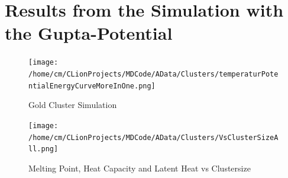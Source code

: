 \section{Results from the Simulation with the Gupta-Potential}

\begin{figure}[!h] 
	\begin{center} 
		\texttt{[image: /home/cm/CLionProjects/MDCode/AData/Clusters/temperaturPotentialEnergyCurveMoreInOne.png]} 
	\end{center} 
	\caption[Gold Cluster Simulation]{Gold Cluster Simulation} 
	\label{GoldClusterSimulationTemperaturEnergy4In1} 
\end{figure} 

\begin{figure}[!h] 
	\begin{center} 
		\texttt{[image: /home/cm/CLionProjects/MDCode/AData/Clusters/VsClusterSizeAll.png]} 
	\end{center} 
	\caption[Melting Point, Heat Capacity and Latent Heat vs Clustersize]{Melting Point, Heat Capacity and Latent Heat vs Clustersize} 
	\label{GoldClusterSimulationVsClustersize} 
\end{figure} 
